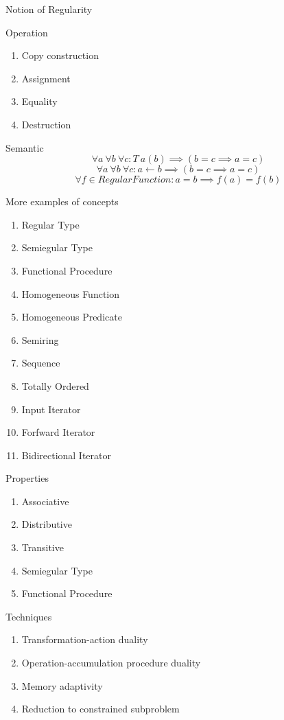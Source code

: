 \documentclass[10pt]{beamer}
\begin{document}
\begin{frame}{Notion of Regularity}
\begin{block}{Operation}
  \begin{enumerate}
    \item Copy construction
    \item Assignment
    \item Equality
    \item Destruction
  \end{enumerate}
\end{block}
\begin{block}{Semantic}
    $$\forall a ~ \forall b ~ \forall c : T~a(b)  \implies(b = c \implies a = c)$$
    $$\forall a ~ \forall b ~ \forall c : a \leftarrow b  \implies(b = c \implies a = c)$$
    $$\forall f \in RegularFunction: a = b \implies f(a) = f(b)$$
\end{block}
\end{frame}

\begin{frame}{More examples of concepts}
\begin{enumerate}
  \item Regular Type
  \item Semiegular Type
  \item Functional Procedure
  \item Homogeneous Function
  \item Homogeneous Predicate
  \item Semiring
  \item Sequence
  \item Totally Ordered
  \item Input Iterator
  \item Forfward Iterator
  \item Bidirectional Iterator
\end{enumerate}
\end{frame}

\begin{frame}{Properties}
\begin{enumerate}
  \item Associative
  \item Distributive
  \item Transitive
  \item Semiegular Type
  \item Functional Procedure
\end{enumerate}
\end{frame}

\begin{frame}{Techniques}
\begin{enumerate}
  \item Transformation-action duality
  \item Operation-accumulation procedure duality
  \item Memory adaptivity
  \item Reduction to constrained subproblem 
\end{enumerate}
\end{frame}
\end{document}
